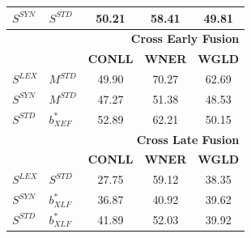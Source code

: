 \documentclass{llncs}
\begin{document}
\begin{table}[!tb]
\begin{minipage}[t]{0.48\textwidth}
\begin{tabular}{@{}llccc@{}}
$S^{\scriptscriptstyle SYN}$ & $S^{\scriptscriptstyle STD}$ & 50.21                      & 58.41                     & 49.81                     \\
\midrule
          &           & \multicolumn{3}{r}{\textbf{Cross Early Fusion}} \\
\midrule
          &           & \textbf{CONLL}                      & \textbf{WNER}                      & \textbf{WGLD}                      \\ \cmidrule{3-5}
$S^{\scriptscriptstyle LEX}$ &$M^{\scriptscriptstyle STD}$        & 49.90                      & 70.27                     & 62.69                     \\
$S^{\scriptscriptstyle SYN}$ & $M^{\scriptscriptstyle STD}$ & 47.27                      & 51.38                     & 48.53                     \\
$S^{\scriptscriptstyle STD}$ & ${b}^*_{\scriptscriptstyle XEF}$        & 52.89                      & 62.21                     & 50.15                     \\
\midrule
          &           & \multicolumn{3}{r}{\textbf{Cross Late Fusion}}  \\
\midrule
          &           & \textbf{CONLL}                      & \textbf{WNER}                      & \textbf{WGLD}                      \\ \cmidrule{3-5}
$S^{\scriptscriptstyle LEX}$ & $S^{\scriptscriptstyle STD}$ & 27.75                      & 59.12                     & 38.35                     \\
$S^{\scriptscriptstyle SYN}$ & ${b}_{\scriptscriptstyle XLF}^{*}$       & 36.87                      & 40.92                     & 39.62                     \\
$S^{\scriptscriptstyle STD}$ & ${b}_{\scriptscriptstyle XLF}^{*}$        & 41.89                      & 52.03                     & 39.92                     \\ \bottomrule
\end{tabular}

\end{minipage}
\centering
\hfill
\begin{minipage}[t]{0.48\textwidth}
\centering


\end{minipage}
\end{table}
\end{document}
